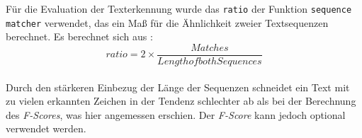 Für die Evaluation der Texterkennung wurde das \verb|ratio| der Funktion \verb|sequence matcher| verwendet, das ein Maß für die Ähnlichkeit zweier Textsequenzen berechnet. Es berechnet sich aus \cite{difflib}:\\
\begin{equation}ratio = 2 \times \frac{Matches}{Length of both Sequences}\end{equation} \\
Durch den stärkeren Einbezug der Länge der Sequenzen schneidet ein Text mit zu vielen erkannten Zeichen in der Tendenz schlechter ab als bei der Berechnung des \textit{F-Scores}, was hier angemessen erschien. Der \textit{F-Score} kann jedoch optional verwendet werden.